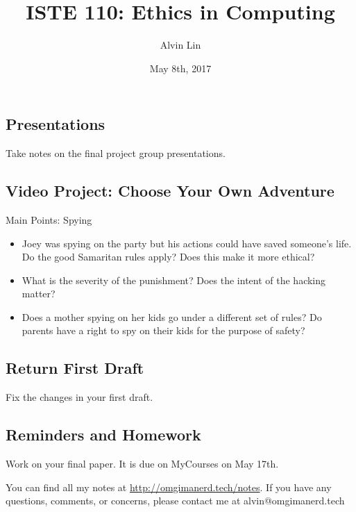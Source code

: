 \documentclass{article}
\title{ISTE 110: Ethics in Computing}
\author{Alvin Lin}
\date{May 8th, 2017}
\begin{document}
\maketitle

\subsection*{Presentations}
Take notes on the final project group presentations.

\subsection*{Video Project: Choose Your Own Adventure}
Main Points: Spying
\begin{itemize}
  \item Joey was spying on the party but his actions could have saved someone's
    life. Do the good Samaritan rules apply? Does this make it more ethical?
  \item What is the severity of the punishment? Does the intent of the hacking
    matter?
  \item Does a mother spying on her kids go under a different set of rules? Do
    parents have a right to spy on their kids for the purpose of safety?
\end{itemize}

\subsection*{Return First Draft}
Fix the changes in your first draft.

\subsection*{Reminders and Homework}
Work on your final paper. It is due on MyCourses on May 17th.

\begin{center}
  You can find all my notes at \url{http://omgimanerd.tech/notes}. If you have
  any questions, comments, or concerns, please contact me at
  alvin@omgimanerd.tech
\end{center}
\end{document}
